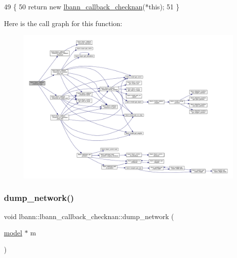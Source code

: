 \begin{DoxyCode}
49                                                  \{
50     \textcolor{keywordflow}{return} \textcolor{keyword}{new} \hyperlink{classlbann_1_1lbann__callback__checknan_a62c093e4f67a4b387dee11fe41b5ec2f}{lbann\_callback\_checknan}(*\textcolor{keyword}{this});
51   \}
\end{DoxyCode}
Here is the call graph for this function\+:\nopagebreak
\begin{figure}[H]
\begin{center}
\leavevmode
\includegraphics[width=350pt]{classlbann_1_1lbann__callback__checknan_ad7156df3cd81c493584ebd4a0c9d96b4_cgraph}
\end{center}
\end{figure}
\mbox{\label{classlbann_1_1lbann__callback__checknan_a335713a3df9194f657f98cccd2f695f5}} 
\subsubsection{\texorpdfstring{dump\+\_\+network()}{dump\_network()}}
{\footnotesize\ttfamily void lbann\+::lbann\+\_\+callback\+\_\+checknan\+::dump\+\_\+network (\begin{DoxyParamCaption}\item[{\hyperlink{classlbann_1_1model}{model} $\ast$}]{m }\end{DoxyParamCaption})\hspace{0.3cm}{\ttfamily [private]}}

